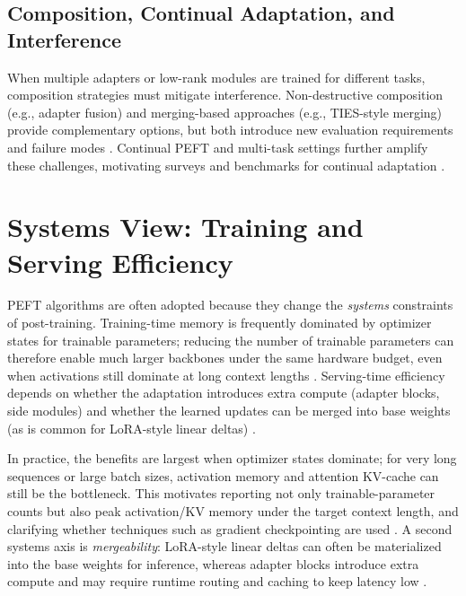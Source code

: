\documentclass[conference]{IEEEtran}
\begin{document}
\subsection{Composition, Continual Adaptation, and Interference}
When multiple adapters or low-rank modules are trained for different tasks, composition strategies must mitigate interference. Non-destructive composition (e.g., adapter fusion) and merging-based approaches (e.g., TIES-style merging) provide complementary options, but both introduce new evaluation requirements and failure modes \cite{pfeiffer2020adapterfusion,yadav2023ties,gauthiercaron2024merging}. Continual PEFT and multi-task settings further amplify these challenges, motivating surveys and benchmarks for continual adaptation \cite{coleman2025parameter}.

\section{Systems View: Training and Serving Efficiency}
PEFT algorithms are often adopted because they change the \emph{systems} constraints of post-training. Training-time memory is frequently dominated by optimizer states for trainable parameters; reducing the number of trainable parameters can therefore enable much larger backbones under the same hardware budget, even when activations still dominate at long context lengths \cite{dettmers2023qlora,han2024parameter}. Serving-time efficiency depends on whether the adaptation introduces extra compute (adapter blocks, side modules) and whether the learned updates can be merged into base weights (as is common for LoRA-style linear deltas) \cite{hu2021lora,houlsby2019parameter}.

In practice, the benefits are largest when optimizer states dominate; for very long sequences or large batch sizes, activation memory and attention KV-cache can still be the bottleneck. This motivates reporting not only trainable-parameter counts but also peak activation/KV memory under the target context length, and clarifying whether techniques such as gradient checkpointing are used \cite{han2024parameter,prottasha2025peft}. A second systems axis is \emph{mergeability}: LoRA-style linear deltas can often be materialized into the base weights for inference, whereas adapter blocks introduce extra compute and may require runtime routing and caching to keep latency low \cite{hu2021lora,houlsby2019parameter,pfeiffer2020adapterhub}.
\end{document}
